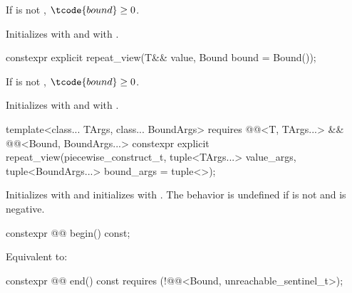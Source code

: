 \begin{itemdescr}
\pnum
\expects
If  is not ,
$\tcode{bound} \ge 0$.

\pnum
\effects
Initializes  with  and
 with .
\end{itemdescr}

%
\begin{itemdecl}
constexpr explicit repeat_view(T&& value, Bound bound = Bound());
\end{itemdecl}

\begin{itemdescr}
\pnum
\expects
If  is not , $\tcode{bound} \ge 0$.

\pnum
\effects
Initializes  with  and
 with .
\end{itemdescr}

%
\begin{itemdecl}
template<class... TArgs, class... BoundArgs>
  requires @@<T, TArgs...> &&
           @@<Bound, BoundArgs...>
constexpr explicit repeat_view(piecewise_construct_t,
  tuple<TArgs...> value_args, tuple<BoundArgs...> bound_args = tuple<>{});
\end{itemdecl}

\begin{itemdescr}
\pnum
\effects
Initializes  with
and
initializes\linebreak{}  with
.
The behavior is undefined if
 is not  and
 is negative.
\end{itemdescr}

%
\begin{itemdecl}
constexpr @@ begin() const;
\end{itemdecl}

\begin{itemdescr}
\pnum
\effects
Equivalent to: 
\end{itemdescr}

%
\begin{itemdecl}
constexpr @@ end() const requires (!@@<Bound, unreachable_sentinel_t>);
\end{itemdecl}

